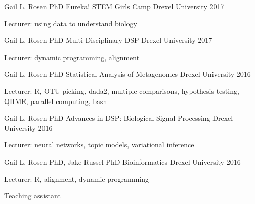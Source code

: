 



\begin{cventries}

\cventry
    {Gail L. Rosen PhD}
    {\href{https://drexel.edu/engineering/academics/high-school-programs/eureka/}{Eureka! STEM Girls Camp}}
    {Drexel University}
    {2017}
    {\begin{cvitems}
        \item Lecturer: using data to understand biology
    \end{cvitems}}
    
\cventry
    {Gail L. Rosen PhD}
    {Multi-Disciplinary DSP}
    {Drexel University}
    {2017}
    {\begin{cvitems}
        \item Lecturer: dynamic programming, alignment
    \end{cvitems}}
    
\cventry
    {Gail L. Rosen PhD}
    {Statistical Analysis of Metagenomes}
    {Drexel University}
    {2016}
    {\begin{cvitems}
        \item Lecturer: R, OTU picking, dada2, multiple comparisons, hypothesis testing, QIIME, parallel computing, bash
    \end{cvitems}}
\cventry
    {Gail L. Rosen PhD}
    {Advances in DSP: Biological Signal Processing}
    {Drexel University}
    {2016}
    {\begin{cvitems}
        \item Lecturer: neural networks, topic models, variational inference
    \end{cvitems}}
    
\cventry
    {Gail L. Rosen PhD, Jake Russel PhD}
    {Bioinformatics}
    {Drexel University}
    {2016}
    {\begin{cvitems}
        \item Lecturer: R, alignment, dynamic programming
        \item Teaching assistant
    \end{cvitems}}
    

\end{cventries}

